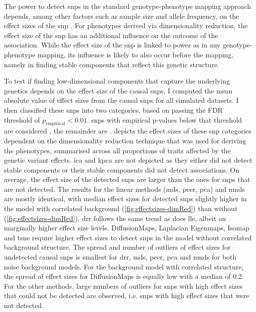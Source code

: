 The power to detect \glspl{snp} in the standard genotype-phenotype mapping approach depends, among other factors such as sample size and allele frequency, on the effect sizes of the \gls{snp} \citep{Cohen1992,Halsey2015,Astle2016}.  For phenotypes derived via dimensionality reduction, the effect size of the \gls{snp} has an additional influence on the outcome of the association.  While the effect size of the \gls{snp} is linked to power as in any genotype-phenotype mapping, its influence is likely to also occur before the mapping, namely in finding stable components that reflect this genetic structure. 

To test if finding low-dimensional components that capture the underlying genetics depends on the effect size of the causal \glspl{snp}, I computed the mean absolute value of effect sizes from the causal \glspl{snp} for all simulated datasets. I then classified these \glspl{snp} into two categories, based on passing the FDR threshold of \(p_\text{empirical} < 0.01\). \glspl{snp} with empirical p-values below that threshold are considered , the remainder are .  depicts the effect sizes of these \gls{snp} categories dependent on the dimensionality reduction technique that was used for deriving the phenotypes, summarised across all proportions of traits affected by the genetic variant effects. \gls{ica} and \gls{kpca} are not depicted as they either did not detect stable components or their stable components did not detect associations. On average, the effect size of the detected \glspl{snp} are larger than the ones for \glspl{snp} that are not detected. The results for the linear methods (\gls{mds}, \gls{peer}, \gls{pca}) and \gls{nmds} are mostly identical, with median effect sizes for detected \glspl{snp} slightly higher in the model with correlated background (\cref{fig:effectsizes-dimRed}) than without (\cref{fig:effectsizes-dimRed}). \gls{drr} follows the same trend as does \gls{lle}, albeit on marginally higher effect size levels. DiffusionMaps, Laplacian Eigenmaps, Isomap and \gls{tsne} require higher effect sizes to detect \glspl{snp} in the model without correlated background structure. The spread and number of outliers of effect sizes for undetected causal \glspl{snp} is smallest for \gls{drr}, \gls{mds}, \gls{peer}, \gls{pca} and \gls{nmds} for both noise background models. For the background model with correlated structure, the spread of effect sizes for DiffusionMaps is equally low with a median of \num{0.2}. For the other methods, large numbers of outliers for \glspl{snp} with high effect sizes that could not be detected are observed, i.e. \glspl{snp} with high effect sizes that were not detected.

